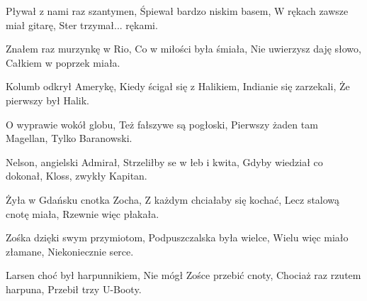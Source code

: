 \documentclass[../../../songbook.tex]{subfiles}
\begin{document}
\begin{multicols}{3}
{Pływał z nami raz szantymen, \newline
Śpiewał bardzo niskim basem, \newline
W rękach zawsze miał gitarę, \newline
Ster trzymał... rękami. \newline

Znałem raz murzynkę w Rio, \newline
Co w miłości była śmiała, \newline
Nie uwierzysz daję słowo, \newline
Całkiem w poprzek miała. \newline

Kolumb odkrył Amerykę, \newline
Kiedy ścigał się z Halikiem, \newline
Indianie się zarzekali, \newline
Że pierwszy był Halik. \newline

O wyprawie wokół globu, \newline
Też fałszywe są pogłoski, \newline
Pierwszy żaden tam Magellan, \newline
Tylko Baranowski. \newline

Nelson, angielski Admirał, \newline
Strzeliłby se w łeb i kwita, \newline
Gdyby wiedział co dokonał, \newline
Kloss, zwykły Kapitan. \newline

Żyła w Gdańsku cnotka Zocha, \newline
Z każdym chciałaby się kochać, \newline
Lecz stalową cnotę miała, \newline
Rzewnie więc płakała. \newline

Zośka dzięki swym przymiotom, \newline
Podpuszczalska była wielce, \newline
Wielu więc miało złamane, \newline
Niekoniecznie serce. \newline

Larsen choć był harpunnikiem, \newline
Nie mógł Zośce przebić cnoty, \newline
Chociaż raz rzutem harpuna, \newline
Przebił trzy U-Booty. \newline

}
\end{multicols}
\end{document}
